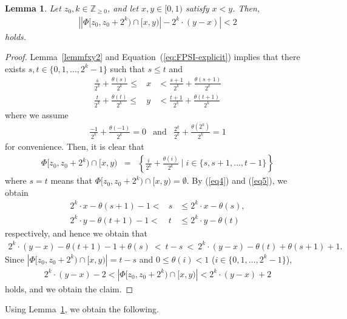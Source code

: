 \documentclass[letter, 11pt]{article}
\newcommand{\1}{\mbox{1}\hspace{-0.25em}\mbox{l}}
\newtheorem{lemma}[theorem]{Lemma}
\begin{document}
\begin{lemma}\label{lemmIvu1}
 Let $z_0,k \in \mathbb{Z}_{\geq 0}$, and let $x,y \in [0,1)$ satisfy $x<y$. 
 Then, 
\begin{eqnarray*}
\left|  | \Phi[z_0, z_0+2^k) \cap [x,y) |  - 2^k \cdotp (y-x) \right| < 2 
\end{eqnarray*}
holds. 
\end{lemma}
\begin{proof}
 Lemma~\ref{lemmfxy2} and Equation~(\ref{eq:FPSI-explicit}) implies that 
  there exists $s, t \in \{0,1,\ldots,2^k-1\}$ such that $s \leq t$ and 
\begin{eqnarray}
 \frac{s}{2^k}+\frac{\theta(s)}{2^k} \leq &x& < \frac{s+1}{2^k}+\frac{\theta(s+1)}{2^k} \label{eq4} \\
 \frac{t}{2^k}+\frac{\theta(t)}{2^k} \leq &y& < \frac{t+1}{2^k}+\frac{\theta(t+1)}{2^k} \label{eq5} 
\end{eqnarray}
 where we assume 
\begin{eqnarray*}
 \frac{-1}{2^k}+\frac{\theta(-1)}{2^k} = 0 &\mbox{and}& 
 \frac{2^k}{2^k}+\frac{\theta(2^k)}{2^k} = 1 
\end{eqnarray*}
  for convenience. 
 Then, it is clear that 
\begin{eqnarray*}
 \Phi[z_0, z_0+2^k) \cap [x,y) 
 &=& \left \{ \frac{i}{2^k}+\frac{\theta(i)}{2^k} \mid i \in \{s, s+1, \ldots, t-1 \} \right \}
\end{eqnarray*} 
 where $s=t$ means that $\Phi[z_0, z_0+2^k) \cap [x,y) = \emptyset$. 
By (\ref{eq4}) and (\ref{eq5}), we obtain 
\begin{eqnarray*}
 2^k \cdotp x - \theta(s+1)-1  < &s& \leq 2^k \cdotp x -\theta(s), \\
 2^k \cdotp y - \theta(t+1)-1  < &t& \leq 2^k \cdotp y -\theta(t)
\end{eqnarray*}
 respectively, and hence we obtain that 
\begin{eqnarray*}
2^k \cdotp (y-x) -\theta(t+1)-1+\theta(s) \ <\ 
t-s 
\ <\ 2^k \cdotp (y-x) -\theta(t)+\theta(s+1)+1. 
\end{eqnarray*}
 Since $| \Phi[z_0, z_0+2^k) \cap [x,y)| = t-s$ and 
  $0 \leq \theta(i) < 1$ ($i \in \{0,1,\ldots,2^k-1\}$), 
\begin{eqnarray*}
 2^k \cdotp (y-x) -2 < \left|\Phi[z_0, z_0+2^k) \cap [x,y) \right| < 2^k \cdotp(y-x) +2
\end{eqnarray*}
 holds, and we obtain the claim. 
\end{proof}
Using Lemma~\ref{lemmIvu1}, 
  we obtain the following.  
\end{document}
